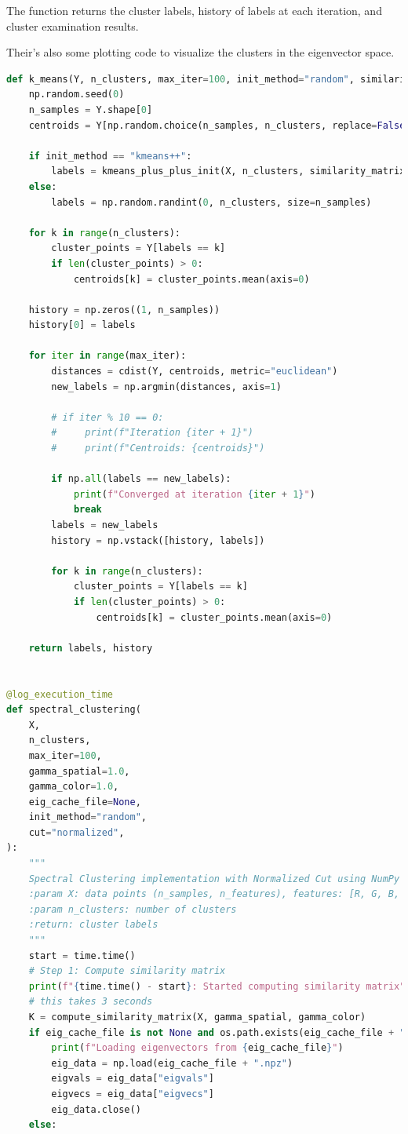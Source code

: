 \documentclass{homework}
\begin{document}
The function returns the cluster labels, history of labels at each iteration, and cluster examination results.

Their's also some plotting code to visualize the clusters in the eigenvector space.

\begin{lstlisting}[language=Python]
def k_means(Y, n_clusters, max_iter=100, init_method="random", similarity_matrix=None):
    np.random.seed(0)
    n_samples = Y.shape[0]
    centroids = Y[np.random.choice(n_samples, n_clusters, replace=False)]

    if init_method == "kmeans++":
        labels = kmeans_plus_plus_init(X, n_clusters, similarity_matrix)
    else:
        labels = np.random.randint(0, n_clusters, size=n_samples)

    for k in range(n_clusters):
        cluster_points = Y[labels == k]
        if len(cluster_points) > 0:
            centroids[k] = cluster_points.mean(axis=0)

    history = np.zeros((1, n_samples))
    history[0] = labels

    for iter in range(max_iter):
        distances = cdist(Y, centroids, metric="euclidean")
        new_labels = np.argmin(distances, axis=1)

        # if iter % 10 == 0:
        #     print(f"Iteration {iter + 1}")
        #     print(f"Centroids: {centroids}")

        if np.all(labels == new_labels):
            print(f"Converged at iteration {iter + 1}")
            break
        labels = new_labels
        history = np.vstack([history, labels])

        for k in range(n_clusters):
            cluster_points = Y[labels == k]
            if len(cluster_points) > 0:
                centroids[k] = cluster_points.mean(axis=0)

    return labels, history


@log_execution_time
def spectral_clustering(
    X,
    n_clusters,
    max_iter=100,
    gamma_spatial=1.0,
    gamma_color=1.0,
    eig_cache_file=None,
    init_method="random",
    cut="normalized",
):
    """
    Spectral Clustering implementation with Normalized Cut using NumPy
    :param X: data points (n_samples, n_features), features: [R, G, B, x, y]
    :param n_clusters: number of clusters
    :return: cluster labels
    """
    start = time.time()
    # Step 1: Compute similarity matrix
    print(f"{time.time() - start}: Started computing similarity matrix")
    # this takes 3 seconds
    K = compute_similarity_matrix(X, gamma_spatial, gamma_color)
    if eig_cache_file is not None and os.path.exists(eig_cache_file + ".npz"):
        print(f"Loading eigenvectors from {eig_cache_file}")
        eig_data = np.load(eig_cache_file + ".npz")
        eigvals = eig_data["eigvals"]
        eigvecs = eig_data["eigvecs"]
        eig_data.close()
    else:


\end{lstlisting}
\end{document}
